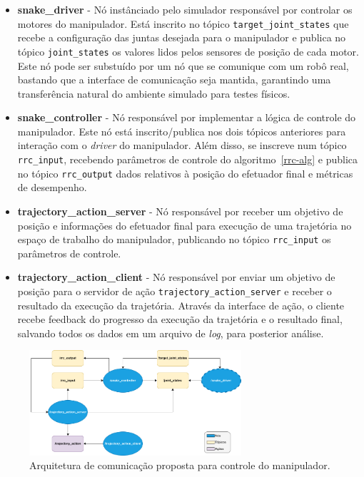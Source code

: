 \begin{itemize}
    \item \textbf{snake\_driver} {-} Nó instânciado pelo simulador responsável por controlar os motores do manipulador.
          Está inscrito no tópico \texttt{target\_joint\_states} que recebe a configuração das juntas desejada para o manipulador
          e publica no tópico \texttt{joint\_states} os valores lidos pelos sensores de posição de cada motor. Este nó pode ser substuído por um nó
          que se comunique com um robô real, bastando que a interface de comunicação seja mantida, garantindo uma transferência natural do ambiente simulado para testes físicos.

    \item \textbf{snake\_controller} {-} Nó responsável por implementar a lógica de controle do manipulador. Este nó está inscrito/publica nos dois tópicos
          anteriores para interação com o \emph{driver} do manipulador. Além disso, se inscreve
          num tópico \texttt{rrc\_input}, recebendo parâmetros de controle do algoritmo~\ref{rrc-alg} e publica no tópico \texttt{rrc\_output} dados
          relativos à posição do efetuador final e métricas de desempenho.

    \item \textbf{trajectory\_action\_server} {-} Nó responsável por receber um objetivo de posição e informações do efetuador final para execução de uma trajetória
          no espaço de trabalho do manipulador, publicando no tópico \texttt{rrc\_input} os parâmetros de controle.

    \item \textbf{trajectory\_action\_client} {-} Nó responsável por enviar um objetivo de posição para o servidor de ação \texttt{trajectory\_action\_server} e
          receber o resultado da execução da trajetória. Através da interface de ação, o cliente recebe feedback do progresso da execução da trajetória e o resultado final,
          salvando todos os dados em um arquivo de \emph{log}, para posterior análise.
\end{itemize}

\begin{figure}
    \centering
    \includegraphics[width=0.7\textwidth]{./Images/com-arch.png}
    \caption{Arquitetura de comunicação proposta para controle do manipulador.}\label{fig:coms_arch}
\end{figure}

